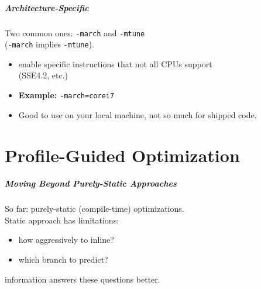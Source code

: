 \documentclass[aspectratio=43]{beamer}
\newenvironment{changemargin}[1]{%
  \begin{list}{}{%
    \setlength{\topsep}{0pt}%
    \setlength{\leftmargin}{#1}%
    \setlength{\rightmargin}{1em}
    \setlength{\listparindent}{\parindent}%
    \setlength{\itemindent}{\parindent}%
    \setlength{\parsep}{\parskip}%
  }%
  \item[]}{\end{list}}
\begin{document}
\begin{frame}
  \frametitle{Architecture-Specific}

  \begin{changemargin}{1.5cm}
  Two common ones: {\tt -march} and {\tt -mtune}\\ \qquad\qquad ({\tt -march} implies {\tt -mtune}).

  \begin{itemize}
    \item enable  specific instructions that not all CPUs  support\\
      \qquad \qquad (SSE4.2, etc.)
    \vfill
    \item {\bf Example:} {\tt -march=corei7}
    \vfill
    \item Good to use on your local machine, not so much for shipped code.
  \end{itemize}
  \end{changemargin}
\end{frame}

\part{Profile-Guided Optimization}
\frame{\partpage}

\begin{frame}
  \frametitle{Moving Beyond Purely-Static Approaches}

  \begin{changemargin}{2cm}
    So far: purely-static (compile-time) optimizations.\\[1em]

    Static approach has limitations: 
    \begin{itemize}
      \item how aggressively to inline?
      \item which branch to predict?
    \end{itemize}
     information answers these questions better.

  \end{changemargin}

\end{frame}
\end{document}
